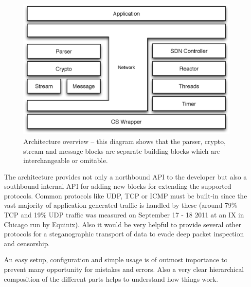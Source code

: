 \documentclass[twocolumn,english]{IEEEtran}
\theoremstyle{plain}
\theoremstyle{plain}
\begin{document}
\begin{figure}[h]
\includegraphics[width=\columnwidth]{Architecture_overview.eps}
\caption{Architecture overview -- this diagram shows that the parser, crypto,
stream and message blocks are separate building blocks which are
interchangeable or omitable.}
\label{fig:arch-overview}
\end{figure}

The architecture provides not only a northbound API to the developer but also
a southbound internal API for adding new blocks for extending the supported
protocols. Common protocols like UDP, TCP or ICMP must be built-in since the
vast majority of application generated traffic is handled by these (around 79\%
TCP and 19\% UDP traffic was measured on September 17 - 18 2011 at an IX in
Chicago run by Equinix\cite{caida:application-protocol-percentage}). Also it
would be very helpful to provide several other protocols for a steganographic
transport of data\cite{ijcsi:dns-steganography} to evade deep packet
inspection and censorship.

An easy setup, configuration and simple usage is of outmost importance to
prevent many opportunity for mistakes and errors. Also a very clear
hierarchical composition of the different parts helps to understand how things
work.
\end{document}
